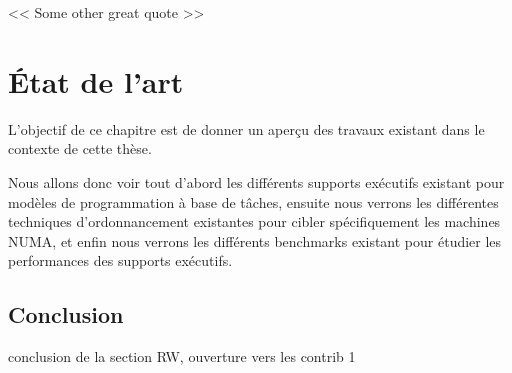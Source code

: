 
\begin{savequote}[6cm]
<< Some other great quote  >>
\end{savequote}
\chapter{État de l'art}\label{chap:rw}
\chaptertoc

L'objectif de ce chapitre est de donner un aperçu des travaux existant dans le contexte de cette thèse.

Nous allons donc voir tout d'abord les différents supports exécutifs existant pour modèles de programmation à base de tâches, ensuite nous verrons les différentes techniques d'ordonnancement existantes pour cibler spécifiquement les machines NUMA, et enfin nous verrons les différents benchmarks existant pour étudier les performances des supports exécutifs.





















\section*{Conclusion}
\begin{todo}
conclusion de la section RW, ouverture vers les contrib 1
\end{todo}
